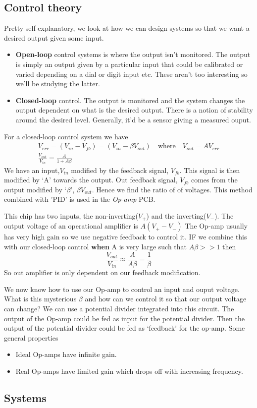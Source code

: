 \subsection{Control theory}
Pretty self explanatory, we look at how we can design systems so that we want a desired output given some input. 
\begin{itemize}
\item \textbf{Open-loop} control systems is where the output isn't monitored. The output is simply an output given by a particular input that could be calibrated or varied depending on a dial or digit input etc. These aren't too interesting so we'll be studying the latter.
\item \textbf{Closed-loop} control. The output is monitored and the system changes the output dependent on what is the desired output. There is a notion of stability around the desired level. Generally, it'd be a sensor giving a measured ouput.
\end{itemize}
For a closed-loop control system we have
\begin{equation}
\begin{gathered}
V_{err} = (V_{in} - V_{fb}) = (V_{in} - \beta V_{out}) \quad \textrm{where} \quad V_{out} = AV_{err} \\ 
\frac{V_{out}}{V_{in}}=\frac{A}{1 +A\beta}
\end{gathered}
\end{equation}
We have an input,$V_{in}$ modified by the feedback signal, $V_{fb}$. This signal is then modified by `A' towards the output. Out feedback signal, $V_{fb}$ comes from the output modified by `$\beta$', $\beta V_{out}$. Hence we find the ratio of of voltages. This method combined with 'PID' is used in the \textit{Op-amp} PCB.
\par
This chip has two inputs, the non-inverting($V_{+}$) and the inverting($V_{-}$). The output voltage of an operational amplifier is \begin{math} A(V_{+} -V_{-})\end{math}
The Op-amp usually has very high gain so we use negative feedback to control it. IF we combine this with our closed-loop control \textbf{when} A is very large such that $A\beta >> 1$ then
\begin{equation}
\frac{V_{out}}{V_{in}} \approx \frac{A}{A\beta} = \frac{1}{\beta} 
\end{equation}
So out amplifier is only dependent on our feedback modification.\par
We now know how to use our Op-amp to control an input and ouput voltage. What is this mysterious $\beta$ and how can we control it so that our output voltage can change? We can use a potential divider integrated into this circuit.
The output of the Op-amp could be fed as input for the potential divider. Then the output of the potential divider could be fed as `feedback' for the op-amp.
Some general properties
\begin{itemize}
\item Ideal Op-amps have infinite gain.
\item Real Op-amps have limited gain which drops off with increasing frequency.
\end{itemize}


\subsection{Systems}
